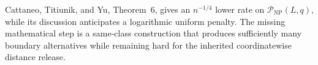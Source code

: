 Cattaneo, Titiunik, and Yu, Theorem~6, gives an \(n^{-1/4}\) lower rate on \(\mathcal P_{\mathrm{NP}}(L,q)\), while its discussion anticipates a logarithmic uniform penalty.  The missing mathematical step is a same-class construction that produces sufficiently many boundary alternatives while remaining hard for the inherited coordinatewise distance release.